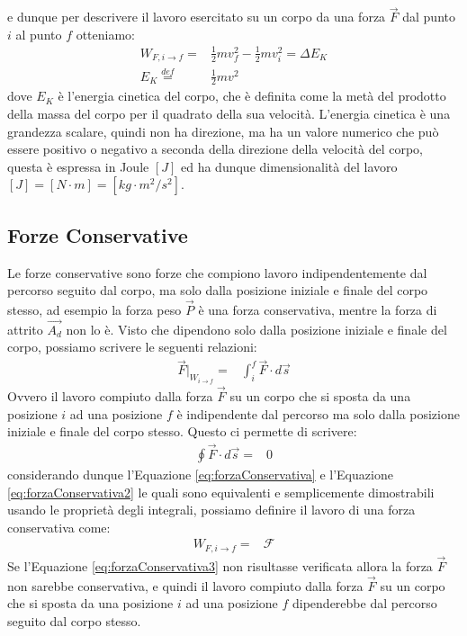             e dunque per descrivere il lavoro esercitato su un corpo da una forza $\vec{F}$ dal punto $i$ al punto $f$ otteniamo:
            \begin{align}
                W_{F,i\to f} =& \frac12mv_f^2-\frac12mv_i^2 = \Delta E_K \\
                E_K \stackrel{def}{=}& \frac12mv^2
            \end{align}
            dove $E_K$ è l'energia cinetica del corpo, che è definita come la metà del prodotto della massa del corpo per il quadrato della sua velocità. L'energia cinetica è una grandezza scalare, quindi non ha direzione, ma ha un valore numerico che può essere positivo o negativo a seconda della direzione della velocità del corpo, questa è espressa in Joule $[J]$ ed ha dunque dimensionalità del lavoro $[J] = [N\cdot m] = [kg\cdot m^2/s^2]$.
        \subsection{Forze Conservative}
            Le forze conservative sono forze che compiono lavoro indipendentemente dal percorso seguito dal corpo, ma solo dalla posizione iniziale e finale del corpo stesso, ad esempio la forza peso $\vec{P}$ è una forza conservativa, mentre la forza di attrito $\vec{A_d}$ non lo è. Visto che dipendono solo dalla posizione iniziale e finale del corpo, possiamo scrivere le seguenti relazioni:
            \begin{align}
                \vec{F}|_{W_{i\to f}} =& \int_i^f \vec{F}\cdot d\vec{s} \label{eq:forzaConservativa}
            \end{align}
            Ovvero il lavoro compiuto dalla forza $\vec{F}$ su un corpo che si sposta da una posizione $i$ ad una posizione $f$ è indipendente dal percorso ma solo dalla posizione iniziale e finale del corpo stesso.\newline
            Questo ci permette di scrivere:
            \begin{align}
                \oint \vec{F}\cdot d\vec{s} =& 0 \label{eq:forzaConservativa2}
            \end{align}
            considerando dunque l'Equazione \ref{eq:forzaConservativa} e l'Equazione \ref{eq:forzaConservativa2} le quali sono equivalenti e semplicemente dimostrabili usando le proprietà degli integrali, possiamo definire il lavoro di una forza conservativa come:
            \begin{align}
                W_{F,i\to f} =& \mathcal{F} \label{eq:forzaConservativa3}
            \end{align}
            Se l'Equazione \ref{eq:forzaConservativa3} non risultasse verificata allora la forza $\vec{F}$ non sarebbe conservativa, e quindi il lavoro compiuto dalla forza $\vec{F}$ su un corpo che si sposta da una posizione $i$ ad una posizione $f$ dipenderebbe dal percorso seguito dal corpo stesso.
